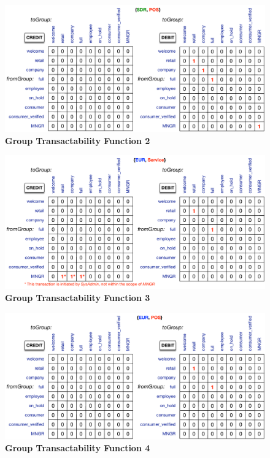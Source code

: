 \vspace*{2cm}

\begin{figure}[h]
\centering
\includegraphics[width=17.5cm]{Figures/GTF2}
\caption{\small\textbf{Group Transactability Function 2}}
\label{fig:GTF2}
\end{figure}
\newpage

\begin{figure}[H]
\centering
\includegraphics[width=17.5cm]{Figures/GTF3}
\caption{\small\textbf{Group Transactability Function 3}}
\label{fig:GTF3}
\end{figure}

\begin{figure}[H]
\centering
\includegraphics[width=17.5cm]{Figures/GTF4}
\caption{\small\textbf{Group Transactability Function 4}}
\label{fig:GTF4}
\end{figure}



